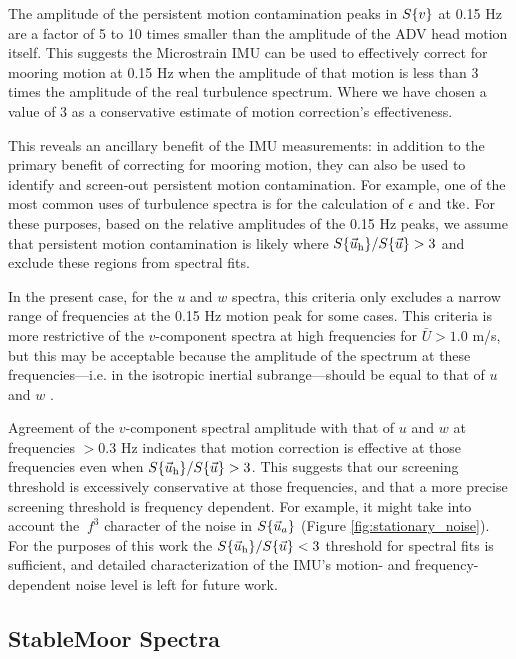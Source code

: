 The amplitude of the persistent motion contamination peaks in $S\{v\}$ at 0.15 Hz are a factor of 5 to 10 times smaller than the amplitude of the ADV head motion itself. This suggests the Microstrain IMU can be used to effectively correct for mooring motion at 0.15 Hz when the amplitude of that motion is less than 3 times the amplitude of the real turbulence spectrum. Where we have chosen a value of 3 as a conservative estimate of motion correction's effectiveness.

This reveals an ancillary benefit of the IMU measurements: in addition to the primary benefit of correcting for mooring motion, they can also be used to identify and screen-out persistent motion contamination. For example, one of the most common uses of turbulence spectra is for the calculation of $\epsilon$ and $\mathrm{tke}$. For these purposes, based on the relative amplitudes of the 0.15 Hz peaks, we assume that persistent motion contamination is likely where $S\{\vec{u}_\mathrm{h}\}/S\{\vec{u}\} > 3$ and exclude these regions from spectral fits.

In the present case, for the $u$ and $w$ spectra, this criteria only excludes a narrow range of frequencies at the 0.15 Hz motion peak for some cases. This criteria is more restrictive of the $v$-component spectra at high frequencies for $\bar U > 1.0$ m/s, but this may be acceptable because the amplitude of the spectrum at these frequencies---i.e. in the isotropic inertial subrange---should be equal to that of $u$ and $w$ \cite[]{Kolmogorov1941c}.

Agreement of the $v$-component spectral amplitude with that of $u$ and $w$ at frequencies $>0.3$ Hz indicates that motion correction is effective at those frequencies even when $S\{\vec{u}_\mathrm{h}\}/S\{\vec{u}\} > 3$. This suggests that our screening threshold is excessively conservative at those frequencies, and that a more precise screening threshold is frequency dependent. For example, it might take into account the $~f^3$ character of the noise in $S\{\vec{u}_a\}$ (Figure \ref{fig:stationary_noise}). For the purposes of this work the $S\{\vec{u}_\mathrm{h}\}/S\{\vec{u}\} < 3$ threshold for spectral fits is sufficient, and detailed characterization of the IMU's motion- and frequency-dependent noise level is left for future work.

\subsection{StableMoor Spectra}

